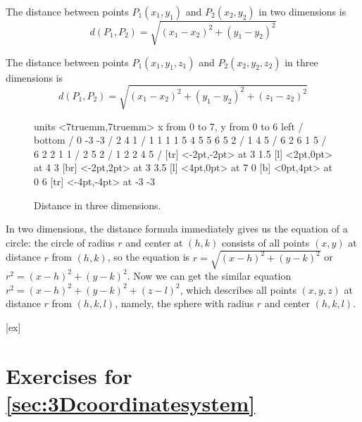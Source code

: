 \begin{formulabox}[Distance]
The distance between points  $P_1(x_1,y_1)$ and $P_2(x_2,y_2)$ in two dimensions is
\[
d(P_1,P_2) = \sqrt{(x_1-x_2)^2+(y_1-y_2)^2}
\]

\medskip

The distance between points $P_1(x_1,y_1,z_1)$ and $P_2(x_2,y_2,z_2)$ in three dimensions is \[
d(P_1,P_2)=\sqrt{(x_1-x_2)^2+(y_1-y_2)^2+(z_1-z_2)^2}
\]
\end{formulabox}

\begin{figure}[H]
\centerline{
\vbox{\beginpicture
\normalgraphs
\setcoordinatesystem units <7truemm,7truemm>
\setplotarea x from 0 to 7, y from 0 to 6
\axis left /
\axis bottom /
 0 -3 -3 /
\setdashes
{} 2 4 1 /
 1 1 1 1 5 4 5 5 6 5 2 /
 1 4 5 /
 6 2 6 1 5 /
\setdots
{} 6 2 2 1 1 /
 2 5 2 /
\setsolid
{} 1 2 2 4 5 /
 [tr] <-2pt,-2pt> at 3 1.5
 [l] <2pt,0pt> at 4 3
 [br] <-2pt,2pt> at 3 3.5
 [l] <4pt,0pt> at 7 0
 [b] <0pt,4pt> at 0 6
 [tr] <-4pt,-4pt> at -3 -3
\endpicture}}
\caption{Distance in three dimensions. \label{fig:3d distance formula}}
\end{figure}

In two dimensions, the distance formula immediately gives us the
equation of a circle: the circle of radius $r$ and center at $(h,k)$
consists of all points $(x,y)$ at distance $r$ from $(h,k)$, so the
equation is $r=\sqrt{(x-h)^2+(y-k)^2}$ or $r^2=(x-h)^2+(y-k)^2$. Now
we can get the similar equation $r^2=(x-h)^2+(y-k)^2+(z-l)^2$, which
describes all points $(x,y,z)$ at distance $r$ from $(h,k,l)$, namely,
the sphere with radius $r$ and center $(h,k,l)$.

[ex]
\section*{Exercises for \ref{sec:3Dcoordinatesystem}}

